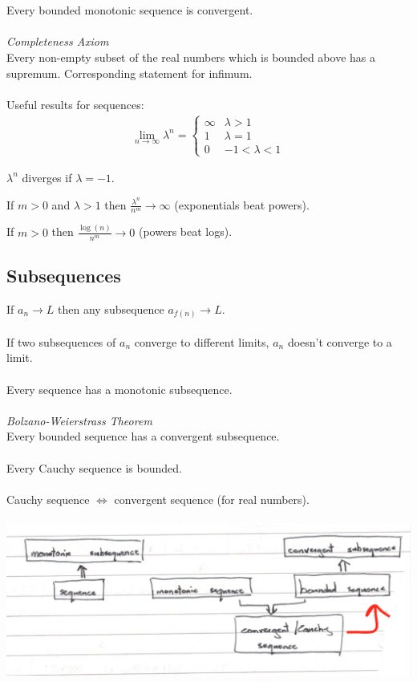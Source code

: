 \documentclass{scrartcl}
\begin{document}
\\\\
Every bounded monotonic sequence is convergent.
\\\\
\textit{Completeness Axiom}
\\
Every non-empty subset of the real numbers which is bounded above has a supremum. Corresponding statement for infimum.
\\\\
Useful results for sequences:
\begin{align}
\lim_{n \to \infty} \lambda^{n} = 
\begin{cases}
\infty & \lambda > 1 \\
1 & \lambda = 1 \\
0 & -1 < \lambda < 1
\end{cases}
\end{align}
\begin{center}
$ \lambda^{n} $ diverges if $ \lambda = -1 $.
\end{center}
\begin{center}
If $ m > 0 $ and $ \lambda > 1 $ then $ \frac{\lambda^{n}}{n^{m}} \to \infty $ (exponentials beat powers).
\end{center}
\begin{center}
If $ m > 0 $ then $ \frac{\log(n)}{n^{m}} \to 0 $ (powers beat logs).
\end{center}

\subsection{Subsequences}
If $ a_{n} \to L $ then any subsequence $ a_{f(n)} \to L $.
\\\\
If two subsequences of $ a_{n} $ converge to different limits, $ a_{n} $ doesn't converge to a limit.
\\\\
Every sequence has a monotonic subsequence.
\\\\
\textit{Bolzano-Weierstrass Theorem}
\\
Every bounded sequence has a convergent subsequence.
\\\\
Every Cauchy sequence is bounded.
\\\\
Cauchy sequence $ \Leftrightarrow $ convergent sequence (for real numbers).
\\\\
\includegraphics[scale=0.35]{sequences}
\end{document}
